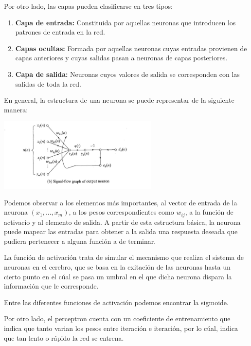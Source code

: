 Por otro lado, las capas pueden clasificarse en tres tipos:

\begin{enumerate}
\item \textbf{Capa de entrada:} Constituida por aquellas neuronas que introducen los patrones de entrada en la red. 
\item \textbf{Capas ocultas:} Formada por aquellas neuronas cuyas entradas provienen de capas anteriores y cuyas salidas pasan a neuronas de capas posteriores.
\item \textbf{Capa de salida:} Neuronas cuyos valores de salida se corresponden con las salidas de toda la red.
\end{enumerate}


En general, la estructura de una neurona se puede representar de la siguiente manera:

\begin{center}
\includegraphics[width=0.6\textwidth]{img/neurona}
\end{center}

Podemos observar a los elementos más importantes, al vector de entrada de la neurona $(x_1,...,x_m)$, a los pesos correspondientes como $w_{ij}$, a la función de activacio y al elemento de salida. A partir de esta estructura básica, la neurona puede mapear las entradas para obtener a la salida una respuesta deseada que pudiera pertenecer a alguna función a de terminar.


La función de activación trata de simular el mecanismo que realiza el sistema de neuronas en el cerebro, que se basa en la exitación de las neuronas hasta un cierto punto en el cúal se pasa un umbral en el que dicha neurona dispara la información que le corresponde. 

Entre las diferentes funciones de activación podemos encontrar la sigmoide.


Por otro lado, el perceptron cuenta con un coeficiente de entrenamiento que indica que tanto varian los pesos entre iteración e iteración, por lo cúal, indica que tan lento o rápido la red se entrena.